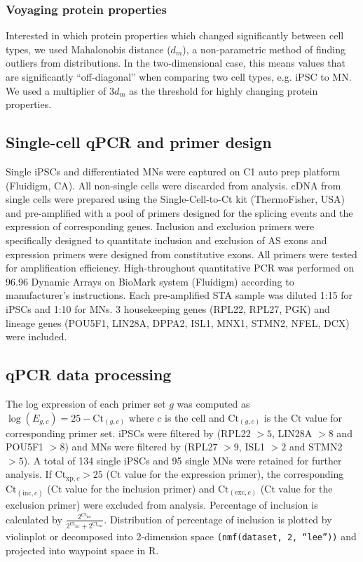 \subsubsection{Voyaging protein properties}

Interested in which protein properties which changed significantly between cell types, we used Mahalonobis distance \cite{DeMaesschalck:2000hv} ($d_m$), a non-parametric method of finding outliers from distributions. In the two-dimensional case, this means values that are significantly ``off-diagonal'' when comparing two cell types, e.g. iPSC to MN. We used a multiplier of $3d_m$ as the threshold for highly changing protein properties.

\subsection{Single-cell qPCR and primer design}

Single iPSCs and differentiated MNs were captured on C1 auto prep platform (Fluidigm, CA). All non-single cells were discarded from analysis. cDNA from single cells were prepared using the Single-Cell-to-Ct kit (ThermoFisher, USA) and pre-amplified with a pool of primers designed for the splicing events and the expression of corresponding genes. Inclusion and exclusion primers were specifically designed to quantitate inclusion and exclusion of AS exons and expression primers were designed from constitutive exons. All primers were tested for amplification efficiency. High-throughout quantitative PCR was performed on 96.96 Dynamic Arrays on BioMark system (Fluidigm) according to manufacturer's instructions. Each pre-amplified STA sample was diluted 1:15 for iPSCs and 1:10 for MNs. 3 housekeeping genes (RPL22, RPL27, PGK) and lineage genes (POU5F1, LIN28A, DPPA2, ISL1, MNX1, STMN2, NFEL, DCX) were included. %

\subsection{qPCR data processing}

The log expression of each primer set $g$ was computed as $\log(E_{g,c}) = 25 - \mathrm{Ct}_{(g,c)}$ where $c$ is the cell and $\mathrm{Ct}_{(g,c)}$ is the $\mathrm{Ct}$ value for corresponding primer set. iPSCs were filtered by (RPL22 $>5$, LIN28A $> 8$ and POU5F1 $> 8$) and MNs were filtered by (RPL27 $> 9$, ISL1 $> 2$ and STMN2 $> 5$). A total of 134 single iPSCs and 95 single MNs were retained for further analysis. If $\mathrm{Ct}_{\mathrm{xp},c}  > 25$ ($\mathrm{Ct}$ value for the expression primer), the corresponding $\mathrm{Ct}_{(\mathrm{inc},c)}$ ($\mathrm{Ct}$ value for the inclusion primer) and $\mathrm{Ct}_{(\mathrm{exc},c)}$ ($\mathrm{Ct}$ value for the exclusion primer) were excluded from analysis. Percentage of inclusion is calculated by $\frac{2^{\mathrm{Ct}_{\mathrm{inc}}}}{2^{\mathrm{Ct}_{\mathrm{inc}}} +2^{\mathrm{Ct}_{\mathrm{exc}}}}$. Distribution of percentage of inclusion is plotted by violinplot or decomposed into 2-dimension space \texttt{(nmf(dataset, 2, ``lee''))} and projected into waypoint space in R.

